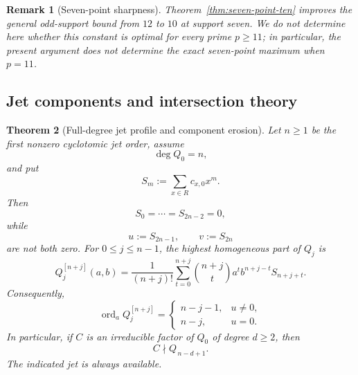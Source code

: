 \documentclass[11pt]{article}
\newtheorem{theorem}{Theorem}[section]
\newtheorem{remark}[theorem]{Remark}
\begin{document}
\begin{remark}[Seven-point sharpness]
Theorem~\ref{thm:seven-point-ten} improves the general odd-support bound
from \(12\) to \(10\) at support seven.  We do not determine here whether
this constant is optimal for every prime \(p\ge11\); in particular, the
present argument does not determine the exact seven-point maximum when
\(p=11\).
\end{remark}

\subsection{Jet components and intersection theory}

\begin{theorem}[Full-degree jet profile and component erosion]
\label{thm:full-degree-component-erosion}
Let \(n\ge1\) be the first nonzero cyclotomic jet order, assume
\[
 \deg Q_0=n,
\]
and put
\[
 S_m:=\sum_{x\in R}c_{x,0}x^m.
\]
Then
\begin{equation}
 S_0=\cdots=S_{2n-2}=0,
 \label{eq:full-degree-moment-window}
\end{equation}
while
\[
 u:=S_{2n-1},\qquad v:=S_{2n}
\]
are not both zero.  For \(0\le j\le n-1\), the highest homogeneous
part of \(Q_j\) is
\begin{equation}
 Q_j^{[n+j]}(a,b)
 =
 \frac1{(n+j)!}
 \sum_{t=0}^{n+j}
 \binom{n+j}{t}
 a^tb^{n+j-t}S_{n+j+t}.
 \label{eq:full-degree-leading-form}
\end{equation}
Consequently,
\[
 \operatorname{ord}_aQ_j^{[n+j]}
 =
 \begin{cases}
 n-j-1,&u\ne0,\\
 n-j,&u=0.
 \end{cases}
\]
In particular, if \(C\) is an irreducible factor of \(Q_0\) of degree
\(d\ge2\), then
\begin{equation}
 \boxed{
 C\nmid Q_{\,n-d+1}.
 }
 \label{eq:full-degree-component-death}
\end{equation}
The indicated jet is always available.
\end{theorem}
\end{document}

